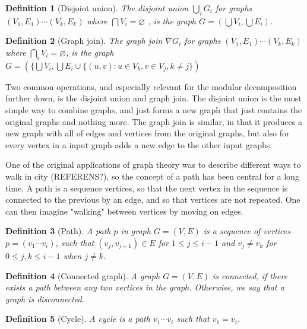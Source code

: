 \documentclass[a4paper]{article}
\newtheorem{definition}{Definition}[section]
\begin{document}
\begin{definition}[Disjoint union]
    The disjoint union $\bigcup_i G_i$ for graphs 
    $(V_1,E_1) \cdots (V_k,E_k)$ where 
    $\bigcap V_i = \varnothing $ , is the graph
    $G = \left( \bigcup V_i,\bigcup E_i \right)$.
\end{definition}

\begin{definition}[Graph join]
    The graph join $\nabla G_i$ for graphs $(V_1,E_1) \cdots (V_k,E_k)$ where 
    $\bigcap_i V_i = \varnothing$, is the graph $G = (\{\bigcup V_i,
    \bigcup E_i \cup \{(u,v) : u \in V_k, v \in V_j, k \neq j \})$
\end{definition}

Two common operations, and especially relevant for the modular decomposition
further down, is the disjoint union and graph join. The disjoint union is the
most simple way to combine graphs, and just forms a new graph that just
contains the original graphs and nothing more.  The graph join is similar, in
that it produces a new graph with all of edges and vertices from the original
graphs, but also for every vertex in a input graph adds a new edge to the other
input graphs.


One of the original applications of graph theory was to describe different ways
to walk in city (REFERENS?), so the concept of a path has been central for a long
time.  A path is a sequence vertices, so that the next vertex in the sequence is
connected to the previous by an edge, and so that vertices are not repeated.
One can then imagine "walking" between vertices by moving on edges.

\begin{definition}[Path]
    A path $p$ in graph $G = (V,E)$ is a sequence of vertices $p = (v_1\cdots
    v_i)$, such that $(v_j,v_{j+1}) \in E$ for $1 \leq j \leq i-1$ and $v_j \neq v_k$ 
    for $0 \leq j,k \leq i-1$ when $j \neq k$.
\end{definition}

\begin{definition}[Connected graph]
    A graph $G = (V,E)$ is connected, if there exists a path between any two
    vertices in the graph. Otherwise, we say that a graph is disconnected.
\end{definition}


\begin{definition}[Cycle]
    A cycle is a path $v_1 \cdots v_i$ such that $v_1 = v_i$.
\end{definition}
\end{document}
